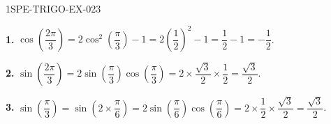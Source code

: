 \begin{corrige}{1SPE-TRIGO-EX-023}

\textbf{1.} $\cos\!\left(\dfrac{2\pi}{3}\right) = 2\cos^2\!\left(\dfrac{\pi}{3}\right) - 1 = 2\left(\dfrac{1}{2}\right)^2 - 1 = \dfrac{1}{2} - 1 = -\dfrac{1}{2}$.

\textbf{2.} $\sin\!\left(\dfrac{2\pi}{3}\right) = 2\sin\!\left(\dfrac{\pi}{3}\right)\cos\!\left(\dfrac{\pi}{3}\right) = 2 \times \dfrac{\sqrt{3}}{2} \times \dfrac{1}{2} = \dfrac{\sqrt{3}}{2}$.

\textbf{3.} $\sin\!\left(\dfrac{\pi}{3}\right) = \sin\!\left(2 \times \dfrac{\pi}{6}\right) = 2\sin\!\left(\dfrac{\pi}{6}\right)\cos\!\left(\dfrac{\pi}{6}\right) = 2 \times \dfrac{1}{2} \times \dfrac{\sqrt{3}}{2} = \dfrac{\sqrt{3}}{2}$. \checkmark

\end{corrige}
